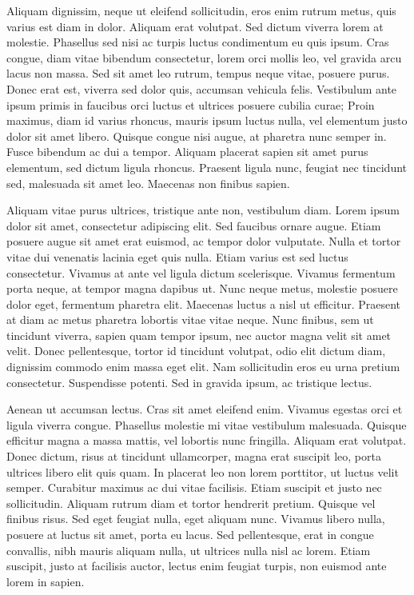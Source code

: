 Aliquam dignissim, neque ut eleifend sollicitudin, eros enim rutrum metus, quis varius est diam in dolor. Aliquam erat volutpat. Sed dictum viverra lorem at molestie. Phasellus sed nisi ac turpis luctus condimentum eu quis ipsum. Cras congue, diam vitae bibendum consectetur, lorem orci mollis leo, vel gravida arcu lacus non massa. Sed sit amet leo rutrum, tempus neque vitae, posuere purus. Donec erat est, viverra sed dolor quis, accumsan vehicula felis. Vestibulum ante ipsum primis in faucibus orci luctus et ultrices posuere cubilia curae; Proin maximus, diam id varius rhoncus, mauris ipsum luctus nulla, vel elementum justo dolor sit amet libero. Quisque congue nisi augue, at pharetra nunc semper in. Fusce bibendum ac dui a tempor. Aliquam placerat sapien sit amet purus elementum, sed dictum ligula rhoncus. Praesent ligula nunc, feugiat nec tincidunt sed, malesuada sit amet leo. Maecenas non finibus sapien.

Aliquam vitae purus ultrices, tristique ante non, vestibulum diam. Lorem ipsum dolor sit amet, consectetur adipiscing elit. Sed faucibus ornare augue. Etiam posuere augue sit amet erat euismod, ac tempor dolor vulputate. Nulla et tortor vitae dui venenatis lacinia eget quis nulla. Etiam varius est sed luctus consectetur. Vivamus at ante vel ligula dictum scelerisque. Vivamus fermentum porta neque, at tempor magna dapibus ut. Nunc neque metus, molestie posuere dolor eget, fermentum pharetra elit. Maecenas luctus a nisl ut efficitur. Praesent at diam ac metus pharetra lobortis vitae vitae neque. Nunc finibus, sem ut tincidunt viverra, sapien quam tempor ipsum, nec auctor magna velit sit amet velit. Donec pellentesque, tortor id tincidunt volutpat, odio elit dictum diam, dignissim commodo enim massa eget elit. Nam sollicitudin eros eu urna pretium consectetur. Suspendisse potenti. Sed in gravida ipsum, ac tristique lectus.

Aenean ut accumsan lectus. Cras sit amet eleifend enim. Vivamus egestas orci et ligula viverra congue. Phasellus molestie mi vitae vestibulum malesuada. Quisque efficitur magna a massa mattis, vel lobortis nunc fringilla. Aliquam erat volutpat. Donec dictum, risus at tincidunt ullamcorper, magna erat suscipit leo, porta ultrices libero elit quis quam. In placerat leo non lorem porttitor, ut luctus velit semper. Curabitur maximus ac dui vitae facilisis. Etiam suscipit et justo nec sollicitudin. Aliquam rutrum diam et tortor hendrerit pretium. Quisque vel finibus risus. Sed eget feugiat nulla, eget aliquam nunc. Vivamus libero nulla, posuere at luctus sit amet, porta eu lacus. Sed pellentesque, erat in congue convallis, nibh mauris aliquam nulla, ut ultrices nulla nisl ac lorem. Etiam suscipit, justo at facilisis auctor, lectus enim feugiat turpis, non euismod ante lorem in sapien.

